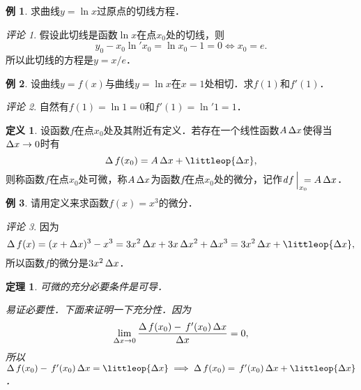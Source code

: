 \documentclass[a4paper,punct=CCT]{ctexbook}
\makeatletter
\newtheorem{theorem}{定理}
\theoremstyle{definition}
\newtheorem*{definition*}{定义}
\newtheorem*{example*}{例}
\theoremstyle{remark}
\newtheorem*{remark}{评论}
\renewcommand*{\proofname}{证}
\renewenvironment{proof}[1][\proofname]{\par
  \pushQED{\qed}%
  \normalfont \topsep6\p@\@plus6\p@\relax
  \trivlist
  \item[\hskip\labelsep
    \bfseries
    #1%
    ]\ignorespaces
}{%
  \popQED\endtrivlist\@endpefalse
}
\makeatother
\begin{document}
\begin{example*}
  求曲线\(y = \ln x\)过原点的切线方程．

  \begin{remark}
    假设此切线是函数\(\ln x\)在点\(x_0\)处的切线，则
    \begin{equation*}
      y_0 - x_0 \ln'x_0 = \ln x_0 - 1 = 0
      \iff
      x_0 = e.
    \end{equation*}
    所以此切线的方程是\(y = x/e\)．
  \end{remark}
\end{example*}

\begin{example*}
  设曲线\(y = f(x)\)与曲线\(y = \ln x\)在\(x = 1\)处相切．求\(f(1)\)和\(f'(1)\)．

  \begin{remark}
    自然有\(f(1) = \ln 1 = 0\)和\(f'(1) = \ln' 1 = 1\)．
  \end{remark}
\end{example*}

\begin{definition*}
  \label{defn:diff}
  设函数\(f\)在点\(x_0\)处及其附近有定义．若存在一个线性函数\(A \mathop{}\!\Delta x\)使得当\(\mathop{}\!\Delta x \to 0\)时有
  \begin{equation*}
    \fwdf\,f(x_0) = A \fwdf x + \littleop{\fwdf x},
  \end{equation*}
  则称函数\(f\)在点\(x_0\)处可微，称\(A \mathop{}\!\Delta x\)为函数\(f\)在点\(x_0\)处的微分，记作\(\diff f\,\smash{\Big\vert_{\mathrlap{x_0}}\,} = A \fwdf x\)．
\end{definition*}

\begin{example*}
  请用定义来求函数\(f(x) = x^3\)的微分．

  \begin{remark}
    因为
    \begin{equation*}
      \fwdf\,f(x)
      = (x+\fwdf x)^3 - x^3
      = 3x^2 \fwdf x + 3x \fwdf x^2 + \fwdf x^3
      = 3x^2 \fwdf x + \littleop{\fwdf x},
    \end{equation*}
    所以函数\(f\)的微分是\(3x^2 \mathop{}\!\Delta x\)．
  \end{remark}
\end{example*}

\begin{theorem}
  \label{thm:diffequivderiv}
  可微的充分必要条件是可导．

  \begin{proof}
    易证必要性．下面来证明一下充分性．因为
    \begin{equation*}
      \lim_{\mathop{}\!\Delta x \to 0} \frac{\mathop{}\!\Delta\,f(x_0) - \,f'(x_0) \mathop{}\!\Delta x}{\mathop{}\!\Delta x} = 0,
    \end{equation*}
    所以\(\fwdf\,f(x_0) - \,f'(x_0) \fwdf x = \littleop{\fwdf x} \implies \fwdf\,f(x_0) = \,f'(x_0) \fwdf x + \littleop{\fwdf x}\)．
  \end{proof}
\end{theorem}
\end{document}
